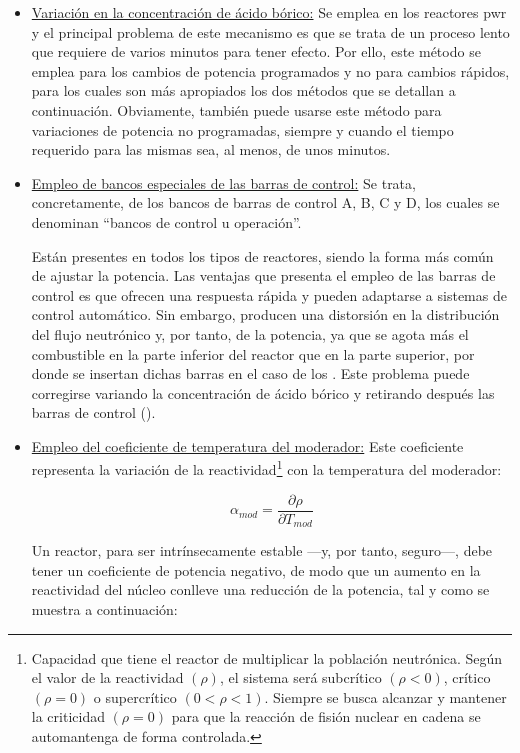 \begin{itemize}
  \item \underline{Variación en la concentración de ácido bórico:} Se emplea en los reactores \acrshort{pwr} y el principal problema de este mecanismo es que se trata de un proceso lento que requiere de varios minutos para tener efecto. Por ello, este método se emplea para los cambios de potencia programados y no para cambios rápidos, para los cuales son más apropiados los dos métodos que se detallan a continuación. Obviamente, también puede usarse este método para variaciones de potencia no programadas, siempre y cuando el tiempo requerido para las mismas sea, al menos, de unos minutos.
  
  \item \underline{Empleo de bancos especiales de las barras de control:} 
  Se trata, concretamente, de los bancos de barras de control A, B, C y D, los cuales se denominan ``bancos de control u operación''.

  Están presentes en todos los tipos de reactores, siendo la forma más común de ajustar la potencia. Las ventajas que presenta el empleo de las barras de control es que ofrecen una respuesta rápida y pueden adaptarse a sistemas de control automático. Sin embargo, producen una distorsión en la distribución del flujo neutrónico y, por tanto, de la potencia, ya que se agota más el combustible en la parte inferior del reactor que en la parte superior, por donde se insertan dichas barras en el caso de los . Este problema puede corregirse variando la concentración de ácido bórico y retirando después las barras de control (\cite{apuntes_centrales}).

  \item \underline{Empleo del coeficiente de temperatura del moderador:} Este coeficiente representa la variación de la \gls{reactividad}\footnote{Capacidad que tiene el reactor de multiplicar la población neutrónica. Según el valor de la reactividad $(\rho)$, el sistema será subcrítico $(\rho<0)$, crítico $(\rho=0)$ o supercrítico $(0<\rho<1)$. Siempre se busca alcanzar y mantener la criticidad $(\rho=0)$ para que la reacción de fisión nuclear en cadena se automantenga de forma controlada.} con la temperatura del moderador: 
  
  \begin{equation}
    \alpha_{mod}=\frac{\partial \rho}{\partial T_{mod}}
  \end{equation}

  Un reactor, para ser intrínsecamente estable ---y, por tanto, seguro---, debe tener un coeficiente de potencia negativo, de modo que un aumento en la \gls{reactividad} del núcleo conlleve una reducción de la potencia, tal y como se muestra a continuación:


\end{itemize}
